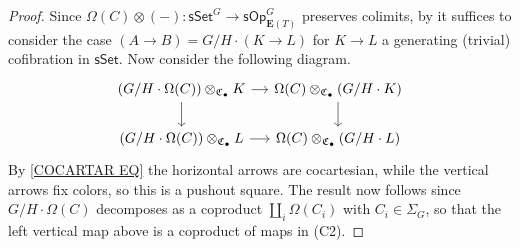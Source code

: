 \documentclass[a4paper,10pt
,draft
]{article}%
\numberwithin{equation}{section}
\numberwithin{figure}{section}
\newtheorem{lemma}[equation]{Lemma}%
\theoremstyle{definition} %
\newcommand{\sSet}{\ensuremath{\mathsf{sSet}}}%
\newcommand{\sOp}{\ensuremath{\mathsf{sOp}}}%
\newcommand{\1}{\ensuremath{\mathbbm 1}}%
\begin{document}
\begin{proof}
	Since $\Omega(C) \otimes (-) \colon \sSet^G \to \sOp^G_{\boldsymbol{E}(T)}$ preserves colimits, 
	by \cite[\eqref{OC-GENGENSETEQ}]{BP_FCOP}
	it suffices to consider the case 
	$(A \to B) = G/H \cdot (K \to L)$ for $K \to L$ a
	generating (trivial) cofibration in $\sSet$.
	Now consider the following diagram.
\begin{equation}
\begin{tikzcd}[column sep = small, ampersand replacement = \&]
	\left(G/H \cdot \Omega(C)\right) \otimes_{\mathfrak{C}_{\bullet}} K 
	\arrow[r] \arrow[d]
\&
	\Omega(C) \otimes_{\mathfrak{C}_{\bullet}} \left(G/H \cdot K\right)
	\arrow[d]
\\
	\left(G/H \cdot \Omega(C)\right) \otimes_{\mathfrak{C}_{\bullet}} L
	\arrow[r] 
\&
	\Omega(C) \otimes_{\mathfrak{C}_{\bullet}} \left(G/H \cdot L\right)
\end{tikzcd}
\end{equation}
By \eqref{COCARTAR EQ} the horizontal arrows are cocartesian, while the vertical arrows fix colors, 
so this is a pushout square.
The result now follows since 
$G/H \cdot \Omega(C)$ decomposes as a coproduct 
$\amalg_i \Omega(C_i)$ with $C_i\in \Sigma_G$,
so that the left vertical map above 
is a coproduct of maps in (C2).
\end{proof}



%
\end{document}
